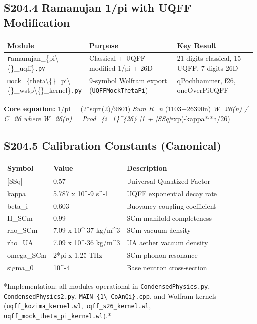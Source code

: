 \documentclass[11pt]{article}
\begin{document}
\subsection*{S204.4 Ramanujan 1/pi with UQFF Modification}

\begin{center}
\begin{longtable}{lll}
\toprule
Module & Purpose & Key Result \tabularnewline
\midrule
\endhead
\verb|r|amanujan\_\{pi\textbackslash\{\}\_uqff\}\verb|.py| & Classical + UQFF-modified 1/pi + 26D & 21 digits classical, 15 UQFF, 7 digits 26D \tabularnewline
\verb|m|ock\_\{theta\textbackslash\{\}\_pi\textbackslash\{\}\_wstp\textbackslash\{\}\_kernel\}\verb|.py| & 9-symbol Wolfram export (\verb|UQFFMockThetaPi|) & qPochhammer, f26, oneOverPiUQFF \tabularnewline
\bottomrule
\end{longtable}
\end{center}

\textbf{Core equation:} 1/pi = (2*sqrt(2)/9801) \emph{ Sum R\_n } (1103+26390n) \emph{ W\_26(n) / C\_26 where W\_26(n) = Prod\_\{i=1\}\textasciicircum{}\{26\} [1 + [SSq]}exp(-kappa*i*n/26)]

\subsection*{S204.5 Calibration Constants (Canonical)}

\begin{center}
\begin{longtable}{lll}
\toprule
Symbol & Value & Description \tabularnewline
\midrule
\endhead
{}[SSq] & 0.57 & Universal Quantized Factor \tabularnewline
kappa & 5.787 x 10\textasciicircum{}-9 s\textasciicircum{}-1 & UQFF exponential decay rate \tabularnewline
beta\_i & 0.603 & Buoyancy coupling coefficient \tabularnewline
H\_SCm & 0.99 & SCm manifold completeness \tabularnewline
rho\_SCm & 7.09 x 10\textasciicircum{}-37 kg/m\textasciicircum{}3 & SCm vacuum density \tabularnewline
rho\_UA & 7.09 x 10\textasciicircum{}-36 kg/m\textasciicircum{}3 & UA aether vacuum density \tabularnewline
omega\_SCm & 2*pi x 1.25 THz & SCm phonon resonance \tabularnewline
sigma\_0 & 10\textasciicircum{}-4 & Base neutron cross-section \tabularnewline
\bottomrule
\end{longtable}
\end{center}

*Implementation: all modules operational in \verb|CondensedPhysics.py|, \verb|CondensedPhysics2.py|, \verb|MAIN_{1\_CoAnQi}.cpp|, and Wolfram kernels (\verb|uqff_kozima_kernel.wl|, \verb|uqff_s26_kernel.wl|, \verb|uqff_mock_theta_pi_kernel.wl|).*


\end{document}
